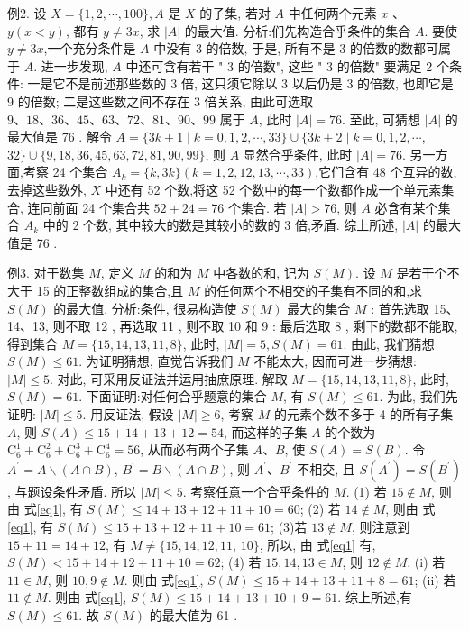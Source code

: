 例2. 设 $X=\{1,2, \cdots, 100\}, A$ 是 $X$ 的子集, 若对 $A$ 中任何两个元素 $x$ 、 $y(x<y)$, 都有 $y \neq 3 x$, 求 $|A|$ 的最大值.
分析:们先构造合乎条件的集合 $A$. 要使 $y \neq 3 x$,一个充分条件是 $A$ 中没有 3 的倍数, 于是, 所有不是 3 的倍数的数都可属于 $A$. 进一步发现, $A$ 中还可含有若干 " 3 的倍数", 这些 " 3 的倍数" 要满足 2 个条件: 一是它不是前述那些数的 3 倍, 这只须它除以 3 以后仍是 3 的倍数, 也即它是 9 的倍数; 二是这些数之间不存在 3 倍关系, 由此可选取 $9 、 18 、 36 、 45 、 63 、 72 、 81 、 90 、 99$ 属于 $A$, 此时 $|A|=76$. 至此, 可猜想 $|A|$ 的最大值是 76 .
解令 $A=\{3 k+1 \mid k=0,1,2, \cdots, 33\} \cup\{3 k+2 \mid k=0,1,2, \cdots$, $32\} \cup\{9,18,36,45,63,72,81,90,99\}$, 则 $A$ 显然合乎条件, 此时 $|A|=76$.
另一方面,考察 24 个集合 $A_k=\{k, 3 k\}(k=1,2,12,13, \cdots, 33)$,它们含有 48 个互异的数, 去掉这些数外, $X$ 中还有 52 个数,将这 52 个数中的每一个数都作成一个单元素集合, 连同前面 24 个集合共 $52+24=76$ 个集合.
若 $|A|>76$, 则 $A$ 必含有某个集合 $A_k$ 中的 2 个数, 其中较大的数是其较小的数的 3 倍,矛盾.
综上所述, $|A|$ 的最大值是 76 .



例3. 对于数集 $M$, 定义 $M$ 的和为 $M$ 中各数的和, 记为 $S(M)$. 设 $M$ 是若干个不大于 15 的正整数组成的集合,且 $M$ 的任何两个不相交的子集有不同的和,求 $S(M)$ 的最大值.
分析:条件, 很易构造使 $S(M)$ 最大的集合 $M$ : 首先选取 15、14、13, 则不取 12 , 再选取 11 , 则不取 10 和 9 : 最后选取 8 , 剩下的数都不能取,得到集合 $M=\{15,14,13,11,8\}$, 此时, $|M|=5, S(M)=61$. 由此, 我们猜想 $S(M) \leqslant 61$. 为证明猜想, 直觉告诉我们 $M$ 不能太大, 因而可进一步猜想: $|M| \leqslant 5$. 对此, 可采用反证法并运用抽庶原理.
解取 $M=\{15,14,13,11,8\}$, 此时, $S(M)=61$. 下面证明:对任何合乎题意的集合 $M$, 有 $S(M) \leqslant 61$. 为此, 我们先证明: $|M| \leqslant 5. \label{eq1} $
用反证法, 假设 $|M| \geqslant 6$, 考察 $M$ 的元素个数不多于 4 的所有子集 $A$, 则
$S(A) \leqslant 15+14+13+12=54$, 而这样的子集 $A$ 的个数为 $\mathrm{C}_6^1+\mathrm{C}_6^2+\mathrm{C}_6^3+ \mathrm{C}_6^4=56$, 从而必有两个子集 $A 、 B$, 使 $S(A)=S(B)$. 令 $A^{\prime}=A \backslash(A \cap B)$, $B^{\prime}=B \backslash(A \cap B)$, 则 $A^{\prime} 、 B^{\prime}$ 不相交, 且 $S\left(A^{\prime}\right)=S\left(B^{\prime}\right)$, 与题设条件矛盾.
所以 $|M| \leqslant 5$.
考察任意一个合乎条件的 $M$.
(1) 若 $15 \notin M$, 则由 式\ref{eq1}, 有 $S(M) \leqslant 14+13+12+11+10=60$;
(2) 若 $14 \notin M$, 则由 式\ref{eq1}, 有 $S(M) \leqslant 15+13+12+11+10=61$;
(3)若 $13 \notin M$, 则注意到 $15+11=14+12$, 有 $M \neq\{15,14,12,11$, $10\}$, 所以, 由 式\ref{eq1} 有, $S(M)<15+14+12+11+10=62$;
(4) 若 $15,14,13 \in M$, 则 $12 \notin M$.
(i) 若 $11 \in M$, 则 $10,9 \notin M$. 则由 式\ref{eq1}, $S(M) \leqslant 15+14+13+11+ 8=61$;
(ii) 若 $11 \notin M$. 则由 式\ref{eq1}, $S(M) \leqslant 15+14+13+10+9=61$.
综上所述,有 $S(M) \leqslant 61$. 故 $S(M)$ 的最大值为 61 .



